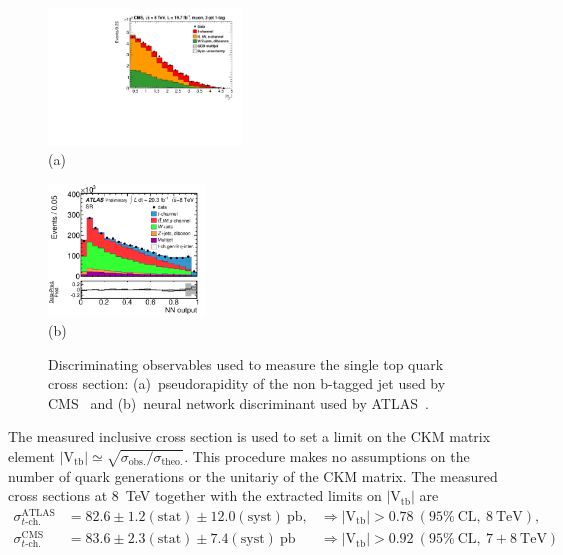 \documentclass{PoS}
\begin{document}
\begin{figure}[htbp]
\begin{center}
\parbox[t]{0.5\textwidth}{\centering\includegraphics[width=0.46\textwidth]{cms_xsec8/etamuon.pdf}\\(a)}
\parbox[t]{0.42\textwidth}{\centering\includegraphics[width=0.37\textwidth]{atlas_xsec8/nnoutput.pdf}\\(b)}

\end{center}
\caption{\label{fig:fit-xsec-8}Discriminating observables used to measure the single top quark cross section: (a)~pseudorapidity of the non b-tagged jet used by CMS~\cite{cms-xsec8} and (b)~neural network discriminant used by ATLAS~\cite{atlas-xsec8}.}

\end{figure}

The measured inclusive cross section is used to set a limit on the CKM matrix element $|\mathrm{V_{tb}}|\simeq\sqrt{\sigma_\mathrm{obs.}/\sigma_\mathrm{theo.}}$. This procedure makes no assumptions on the number of quark generations or the unitariy of the CKM matrix. The measured cross sections at 8~TeV together with the extracted limits on $\mathrm{|V_{tb}|}$ are 
\begin{align}
\sigma_{t\mbox{-}\mathrm{ch.}}^\mathrm{ATLAS}&=82.6\pm1.2\mathrm{(stat)}\pm12.0\mathrm{(syst)}~\mathrm{pb}, &\Rightarrow |\mathrm{V_{tb}}|>0.78~\mathrm{(95\%~CL,~8~TeV)}, \\
\sigma_{t\mbox{-}\mathrm{ch.}}^\mathrm{CMS}&=83.6\pm2.3\mathrm{(stat)}\pm7.4\mathrm{(syst)}~\mathrm{pb} &\Rightarrow |\mathrm{V_{tb}}|>0.92~\mathrm{(95\%~CL,~7+8~TeV)}
\end{align}
\end{document}
